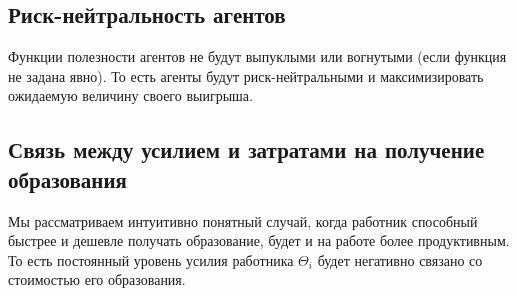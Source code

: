 \subsection{Риск-нейтральность агентов}
\indent\setlength{\parindent}{1em}Функции полезности агентов не будут выпуклыми или вогнутыми (если функция не задана явно). То есть агенты будут риск-нейтральными и максимизировать ожидаемую величину своего выигрыша.
\subsection{Связь между усилием и затратами на получение образования}
\indent\setlength{\parindent}{1em}Мы рассматриваем интуитивно понятный случай, когда работник способный быстрее и дешевле получать образование, будет и на работе более продуктивным. То есть постоянный уровень усилия работника $\Theta_i$ будет негативно связано со стоимостью его образования.
